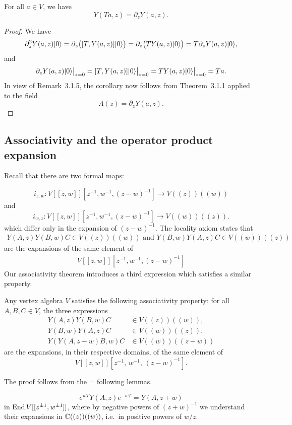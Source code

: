 \documentclass[12pt]{article}
\begin{document}
\begin{corollary}
For all $a \in V$, we have
\[
Y(Ta, z) = \partial_z Y(a, z).
\]
\end{corollary}

\begin{proof}
We have
\[
\partial_z^2 Y(a, z)\lvert 0 \rangle 
= \partial_z\big([T, Y(a, z)]\lvert 0 \rangle\big)
= \partial_z\big(TY(a, z)\lvert 0 \rangle\big)
= T\partial_z Y(a, z)\lvert 0 \rangle,
\]
and
\[
\partial_z Y(a, z)\lvert 0 \rangle\big|_{z=0}
= [T, Y(a, z)]\lvert 0 \rangle\big|_{z=0}
= TY(a, z)\lvert 0 \rangle\big|_{z=0}
= Ta.
\]
In view of Remark~3.1.5, the corollary now follows from Theorem~3.1.1 applied to the field 
\[
A(z) = \partial_z Y(a, z).
\]
\end{proof}

\subsection{Associativity and the operator product expansion}
Recall that there are two formal maps:

\[i_{z,w} : V[[z,w]][z^{-1},w^{-1},(z-w)^{-1}] \longrightarrow V((z))((w))\]
and
\[
i_{w,z} : V[[z,w]][z^{-1},w^{-1},(z-w)^{-1}] \longrightarrow V((w))((z)).
\]
which differ only in the expansion of $(z-w)^{-1}$. The locality axiom states that \begin{align*}
    Y(A,z)Y(B,w)C \in V((z))((w)) \text{ and } Y(B,w)Y(A,z)C \in V((w))((z))
\end{align*} are the expansions of the same element of \begin{align*}
    V[[z,w]][z^{-1},w^{-1},(z-w)^{-1}]
\end{align*} Our associativity theorem introduces a third expression which satisfies a similar property.

\begin{theorem}[Associativity]
Any vertex algebra $V$ satisfies the following associativity property:
for all $A,B,C \in V$, the three expressions
\begin{align*}
Y(A,z)Y(B,w)C &\in V((z))((w)), \\[4pt]
Y(B,w)Y(A,z)C &\in V((w))((z)), \\[4pt]
Y(Y(A,z-w)B,w)C &\in V((w))((z-w))
\end{align*}
are the expansions, in their respective domains, of the same element of
\[
V[[z,w]][z^{-1},\,w^{-1},\,(z-w)^{-1}].
\]
\end{theorem}
The proof follows from the = following lemmas.
\begin{lemma}
\label{lemma:translation}
\[
e^{wT} Y(A,z) e^{-wT} = Y(A,z+w)
\]
in $\operatorname{End} V[[z^{\pm1}, w^{\pm1}]]$, where by negative powers of $(z+w)^{-1}$ we understand their
expansions in $\mathbb{C}((z))((w))$, i.e.\ in positive powers of $w/z$.
\end{lemma}
\end{document}
